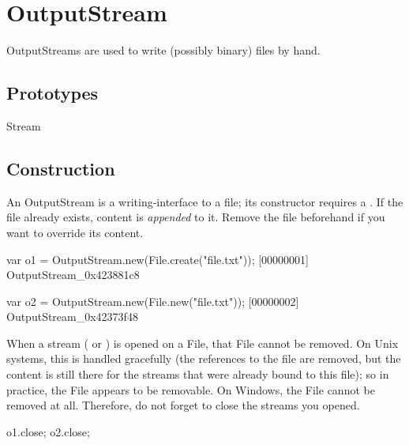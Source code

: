 
\section{OutputStream}

OutputStreams are used to write (possibly binary) files by hand.

\subsection{Prototypes}
\begin{refObjects}
\item[Stream]
\end{refObjects}

\subsection{Construction}
\label{sec:specs:OutputStream:ctor}

An OutputStream is a writing-interface to a file; its constructor
requires a .  If the file already exists, content is
\emph{appended} to it.  Remove the file beforehand if you want to
override its content.

\begin{urbiscript}
var o1 = OutputStream.new(File.create("file.txt"));
[00000001] OutputStream_0x423881c8

var o2 = OutputStream.new(File.new("file.txt"));
[00000002] OutputStream_0x42373f48
\end{urbiscript}

When a stream ( or ) is
opened on a File, that File cannot be removed.  On Unix systems, this is
handled gracefully (the references to the file are removed, but the content
is still there for the streams that were already bound to this file); so in
practice, the File appears to be removable.  On Windows, the File cannot be
removed at all.  Therefore, do not forget to close the streams you opened.

\begin{urbiscript}
o1.close;
o2.close;
\end{urbiscript}


